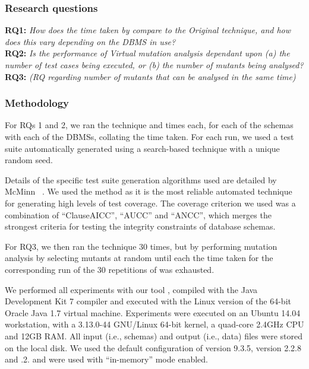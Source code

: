 \subsubsection{Research questions}

\textbf{RQ1: }\emph{How does the time taken by \vma compare to the Original technique, and how does
this vary depending on the DBMS in use?}\\

\textbf{RQ2: }\emph{Is the performance of Virtual mutation analysis dependant upon (a) the number of test cases being
executed, or (b) the number of mutants being analysed?}\\

\textbf{RQ3: }\emph{(RQ regarding number of mutants that can be analysed in the same time)}\\


\subsubsection{Methodology}
For RQs 1 and 2, we ran the \Original technique and  times each, for each of the schemas with each of the DBMSs, collating the time taken. For each run, we used a test suite automatically generated using a search-based technique with a unique random seed. 

Details of the specific test suite generation algorithms used are detailed by McMinn \etal~\cite{McMinn2015}. We used the \AVM method as it is the most reliable automated technique for generating high levels of test coverage. The coverage criterion we used was a combination of ``ClauseAICC'', ``AUCC'' and ``ANCC'', which merges the strongest criteria for testing the integrity constraints of database schemas.

For RQ3, we then ran the \Original technique 30 times, but by performing mutation analysis by selecting mutants at random until each the time taken for the corresponding run of the 30 repetitions of \vma was exhausted.

We performed all experiments with our \SA tool \cite{Kapfhammer2013,Wright2014,McMinn2015},
compiled with the Java Development Kit 7 compiler and executed with the Linux version of the 64-bit Oracle Java 1.7 virtual machine. Experiments were executed on an Ubuntu 14.04 workstation, with a 3.13.0-44 GNU/Linux 64-bit kernel, a quad-core 2.4GHz CPU and 12GB RAM. All input (i.e., schemas) and output (i.e., data) files were stored on the local disk. We used the default configuration of \PostgreSQL version 9.3.5, \HyperSQL version 2.2.8 and .2. \HyperSQL and \SQLite were used with ``in-memory'' mode enabled.


